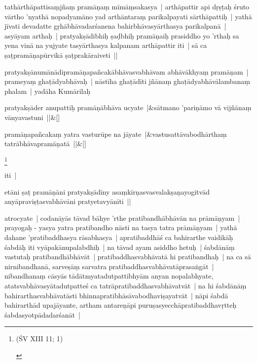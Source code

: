 \documentclass[article,12pt,a4paper]{memoir}%
\newcounter{parCount}
\begin{document}
	  
	  \pstart \leavevmode%
	\label{thakur75-99.1}tathārthāpattisaṃjñaṃ pramāṇaṃ mīmāṃsakasya | arthāpattir api dṛṣṭaḥ śruto vārtho 'nyathā nopadyamāno yad arthāntaraṃ parikalpayati sārthāpattiḥ | yathā jīvati devadatte gṛhābhāvadarśanena bahirbhāvasyārthasya parikalpanā | asyāyam arthaḥ | pratyakṣādibhiḥ ṣaḍbhiḥ pramāṇaiḥ prasiddho yo 'rthaḥ sa yena vinā na yujyate tasyārthasya kalpanam arthāpattir iti | sā ca ṣaṭpramāṇapūrvikā ṣaṭprakāraiveti ||
	{}
	\pend%
      

	  
	  \pstart \leavevmode%
	\label{thakur75-99.6}pratyakṣānumānādipramāṇapañcakābhāvasvabhāvam abhāvākhyaṃ pramāṇam | prameyaṃ ghaṭādyabhāvaḥ | nāstīha ghaṭādīti jñānaṃ ghaṭādyabhāvālambanaṃ phalam | yadāha Kumārilaḥ
	{}
	\pend%
      
	    
	    \stanza[\smallbreak]
	  pratyakṣāder anupattiḥ pramāṇābhāva ucyate |&sātmano 'pariṇāmo vā vijñānaṃ vānyavastuni ||\&[\smallbreak]
	  
	  
	  
	    
	    \stanza[\smallbreak]
	  pramāṇapañcakaṃ yatra vasturūpe na jāyate |&vastusattāvabodhārthaṃ tatrābhāvapramāṇatā ||\&[\smallbreak]
	  
	  
	  \footnote{\begin{english}(ŚV XIII 11; 1)\end{english}}

	  
	  \pstart \leavevmode%
	iti | 
	{}
	\pend%
      

	  
	  \pstart \leavevmode%
	etāni ṣaṭ pramāṇāni pratyakṣādīny asaṃkīrṇasvasvalakṣaṇayogitvād anyāpraviṣṭasvabhāvāni pratyetavyānīti ||
	{}
	\pend%
      

	  
	  \pstart \leavevmode%
	\label{thakur75-99.15}atrocyate | codanāyās tāvad bāhye 'rthe pratibandhābhāvān na prāmāṇyam | prayogaḥ - yasya yatra pratibandho nāsti na tasya tatra prāmāṇyam | yathā dahane 'pratibaddhasya rāsabhasya | apratibaddhāś ca bahirarthe vaidikāḥ śabdāḥ iti vyāpakānupalabdhiḥ | na tāvad ayam asiddho hetuḥ | śabdānāṃ vastutaḥ pratibandhābhāvāt | pratibaddhasvabhāvatā hi pratibandhaḥ | na ca sā nirnibandhanā, sarveṣāṃ sarvatra pratibaddhasvabhāvatāprasaṅgāt | nibandhanaṃ cāsyās tādātmyatadutpattibhyām anyan nopalabhyate, atatsvabhāvasyātadutpatteś ca tatrāpratibaddhasvabhāvatvāt | na hi śabdānāṃ bahirarthasvabhāvatāsti bhinnapratibhāsāvabodhaviṣayatvāt | nāpi śabdā bahirarthād upajāyante, artham antareṇāpi puruṣasyecchāpratibaddhavṛtteḥ śabdasyotpādadarśanāt |
	{}
	\pend%
      
\end{document}
